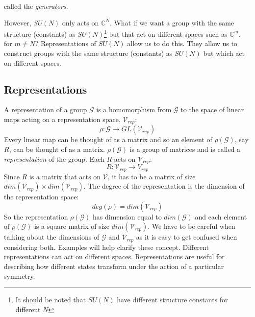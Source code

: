 called the \textit{generators}.
\par However, $SU(N)$ only acts on $\mathbb{C}^N$. What if we want a group with
the same structure (constants) as $SU(N)$\footnote{It should be noted that $SU(N)$ have different
structure constants for different $N$} but that act on different spaces such as 
$\mathbb{C}^m$, for $m\neq N$? Representations of $SU(N)$ allow us to do this.
They allow us to construct groups with the same structure (constants) as
$SU(N)$ but which act on different spaces.
\subsection{Representations}
A representation of a group $\mathcal{G}$ is a homomorphism from $\mathcal{G}$
to the space of linear maps acting on a representation space,
$\mathcal{V}_{rep}$:
\begin{equation}
  \rho:\mathcal{G}\rightarrow GL(\mathcal{V}_{rep})
\end{equation}
Every linear map can be thought of as a matrix and so an element of
$\rho(\mathcal{G})$, say $R$, can be thought of as a matrix.
$\rho(\mathcal{G})$ is a group of matrices and is called
a \textit{representation} of the group. Each $R$ acts on $\mathcal{V}_{rep}$:
\begin{equation}
  R:\mathcal{V}_{rep}\rightarrow V_{rep}
\end{equation}
Since $R$ is a matrix that acts on $\mathcal{V}$, it has to be a matrix of size
$dim(\mathcal{V}_{rep})\times dim(\mathcal{V}_{rep})$. The degree of the
representation is the dimension of the representation space:
\begin{equation}
  deg(\rho) = dim(\mathcal{V}_{rep})
\end{equation}
So the representation $\rho(\mathcal{G})$ has dimension equal to
$dim(\mathcal{G})$ and each element of $\rho(\mathcal{G})$ is a square matrix
of size $dim(\mathcal{V}_{rep})$. We have to be careful when talking about the 
dimensions of $\mathcal{G}$ and $\mathcal{V}_{rep}$ as it is easy to get
confused when considering both. Examples will help clarify these concept.
Different representations can act on different spaces. Representations are
useful for describing how different states transform under the action of a 
particular symmetry.

